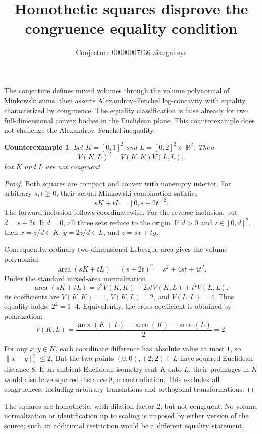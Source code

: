 \documentclass[11pt]{article}
\title{Homothetic squares disprove the congruence equality condition}
\author{Conjecture 00000007136 \quad ziangni-sys}
\date{}
\newtheorem*{proposition}{Counterexample}
\begin{document}
\maketitle
The conjecture defines mixed volumes through the volume polynomial of Minkowski sums, then asserts Alexandrov--Fenchel log-concavity with equality characterized by congruence. The equality classification is false already for two full-dimensional convex bodies in the Euclidean plane. This counterexample does not challenge the Alexandrov--Fenchel inequality.

\begin{proposition}
Let $K=[0,1]^2$ and $L=[0,2]^2\subset\mathbb R^2$. Then
\[
 V(K,L)^2=V(K,K)V(L,L),
\]
but $K$ and $L$ are not congruent.
\end{proposition}
\begin{proof}
Both squares are compact and convex with nonempty interior. For arbitrary $s,t\geq0$, their actual Minkowski combination satisfies
\[
 sK+tL=[0,s+2t]^2.
\]
The forward inclusion follows coordinatewise. For the reverse inclusion, put $d=s+2t$. If $d=0$, all three sets reduce to the origin. If $d>0$ and $z\in[0,d]^2$, then $x=z/d\in K$, $y=2z/d\in L$, and $z=sx+ty$.

Consequently, ordinary two-dimensional Lebesgue area gives the volume polynomial
\[
 \operatorname{area}(sK+tL)=(s+2t)^2=s^2+4st+4t^2.
\]
Under the standard mixed-area normalization
\[
 \operatorname{area}(sK+tL)
 =s^2V(K,K)+2stV(K,L)+t^2V(L,L),
\]
its coefficients are $V(K,K)=1$, $V(K,L)=2$, and $V(L,L)=4$. Thus equality holds: $2^2=1\cdot4$. Equivalently, the cross coefficient is obtained by polarization:
\[
 V(K,L)=\frac{\operatorname{area}(K+L)-\operatorname{area}(K)-\operatorname{area}(L)}2=2.
\]

For any $x,y\in K$, each coordinate difference has absolute value at most $1$, so $\|x-y\|_2^2\leq2$. But the two points $(0,0),(2,2)\in L$ have squared Euclidean distance $8$. If an ambient Euclidean isometry sent $K$ onto $L$, their preimages in $K$ would also have squared distance $8$, a contradiction. This excludes all congruences, including arbitrary translations and orthogonal transformations.
\end{proof}

The squares are homothetic, with dilation factor $2$, but not congruent. No volume normalization or identification up to scaling is imposed by either version of the source; such an additional restriction would be a different equality statement.
\end{document}

